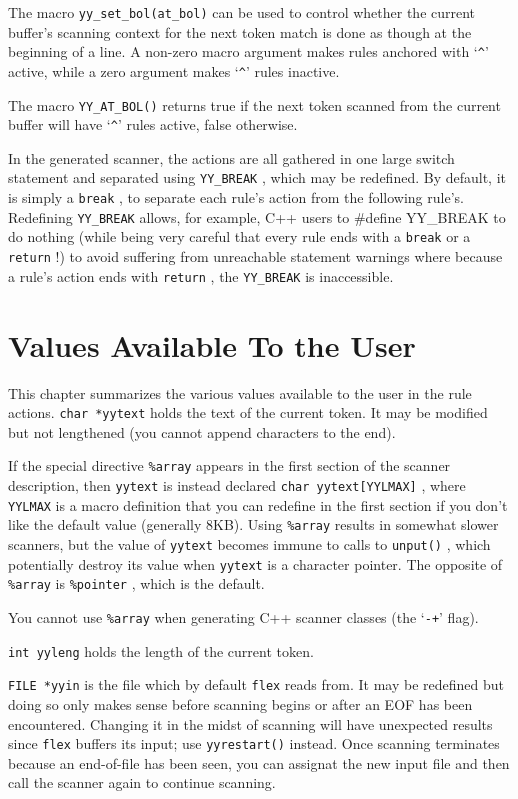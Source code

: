 \documentclass[openany,oneside]{book}
\begin{document}
The macro \verb`yy_set_bol(at_bol)` can be used to control whether the
current buffer's scanning context for the next token match is done as
though at the beginning of a line.  A non-zero macro argument makes
rules anchored with ‘\verb`^`’ active, while a zero argument makes
‘\verb`^`’ rules inactive.

The macro \verb`YY_AT_BOL()` returns true if the next token scanned from
the current buffer will have ‘\verb`^`’ rules active, false otherwise.

In the generated scanner, the actions are all gathered in one large
switch statement and separated using \verb`YY_BREAK` , which may be
redefined.  By default, it is simply a \verb`break` , to separate each
rule's action from the following rule's.  Redefining \verb`YY_BREAK` allows, for example, C++ users to \#{}define YY\_{}BREAK to do nothing (while
being very careful that every rule ends with a \verb`break` or a \verb`return` !) to avoid suffering from unreachable statement warnings
where because a rule's action ends with \verb`return` , the \verb`YY_BREAK` is inaccessible.
\chapter{Values Available To the User}


This chapter summarizes the various values available to the user in the
rule actions. \verb`char *yytext` holds the text of the current token.  It may be modified but not
lengthened (you cannot append characters to the end).

If the special directive \verb`%array` appears in the first section of
the scanner description, then \verb`yytext` is instead declared \verb`char yytext[YYLMAX]` , where \verb`YYLMAX` is a macro definition
that you can redefine in the first section if you don't like the default
value (generally 8KB).  Using \verb`%array` results in somewhat slower
scanners, but the value of \verb`yytext` becomes immune to calls to \verb`unput()` , which potentially destroy its value when \verb`yytext` is
a character pointer.  The opposite of \verb`%array` is \verb`%pointer` ,
which is the default.

You cannot use \verb`%array` when generating C++ scanner classes (the
‘\verb`-+`’ flag).

 \verb`int yyleng` holds the length of the current token.

 \verb`FILE *yyin` is the file which by default \verb`flex` reads from.  It may be
redefined but doing so only makes sense before scanning begins or after
an EOF has been encountered.  Changing it in the midst of scanning will
have unexpected results since \verb`flex` buffers its input; use \verb`yyrestart()` instead.  Once scanning terminates because an
end-of-file has been seen, you can assignat the new input
file and then call the scanner again to continue scanning.
\end{document}
